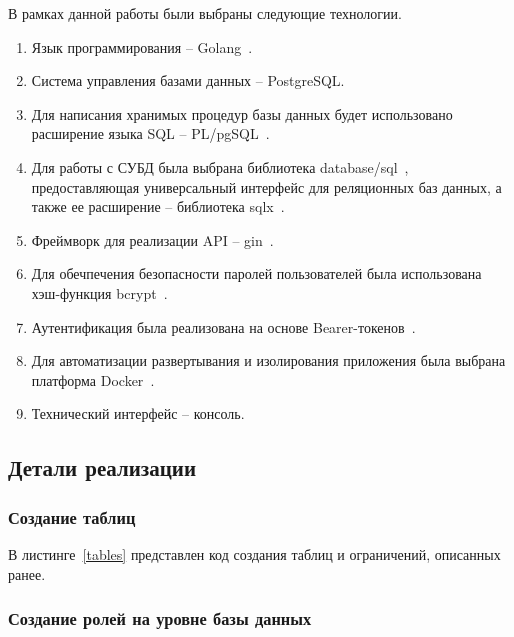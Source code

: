 В рамках данной работы были выбраны следующие технологии.
\begin{enumerate}[label=\arabic*)]
	\item Язык программирования -- Golang~\cite{go}.
	\item Система управления базами данных -- PostgreSQL. 
	\item Для написания хранимых процедур базы данных будет использовано расширение языка SQL -- PL/pgSQL~\cite{pgSQL}.
	\item Для работы с СУБД была выбрана библиотека database/sql~\cite{go-sql}, предоставляющая универсальный интерфейс для реляционных баз данных, а также ее расширение -- библиотека sqlx~\cite{sqlx}.
	\item Фреймворк для реализации API -- gin~\cite{gin}.
	\item Для обечпечения безопасности паролей пользователей была использована хэш-функция bcrypt~\cite{bcrypt}. 
	\item Аутентификация была реализована на основе Bearer-токенов~\cite{bearer}.
	\item Для автоматизации развертывания и изолирования приложения была выбрана платформа Docker~\cite{docker}. 
	\item Технический интерфейс -- консоль. 
\end{enumerate}

\subsection{Детали реализации}

\subsubsection{Создание таблиц}

В листинге~\ref{tables} представлен код создания таблиц и ограничений, описанных ранее.


\subsubsection{Создание ролей на уровне базы данных}

